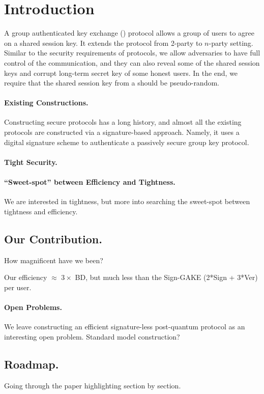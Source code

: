 \newcommand{\introGAKE}{\text{GAKE}\xspace}
\newcommand{\introAKE}{\text{AKE}\xspace}


\section{Introduction}\label{sec:introduction}
A group authenticated key exchange (\introGAKE) protocol allows a group of users to agree on a shared session key. It extends the \introAKE protocol from 2-party to $n$-party setting. Similar to the security requirements of \introAKE protocols, we allow adversaries to have full control of the communication, and they can also reveal some of the shared session keys and corrupt long-term secret key of some honest users. 
In the end, we require that the shared session key from a \introGAKE should be pseudo-random.

\paragraph{Existing Constructions.}
Constructing secure \introGAKE protocols has a long history, and almost all the existing protocols \cite{} are constructed via a signature-based approach. Namely, it uses a digital signature scheme to authenticate a passively secure group key protocol.


\paragraph{Tight Security.}

\paragraph{``Sweet-spot'' between Efficiency and Tightness.}
We are interested in tightness, but more into searching the sweet-spot between tightness and efficiency.

\subsection{Our Contribution.}
How magnificent have we been?

Our efficiency $\approx$ $3\times $ BD, but much less than the Sign-GAKE (2*Sign + 3*Ver) per user.

\paragraph{Open Problems.}
We leave constructing an efficient signature-less post-quantum \introGAKE protocol as an interesting open problem. 
Standard model construction?


\subsection{Roadmap.}
Going through the paper highlighting section by section.
